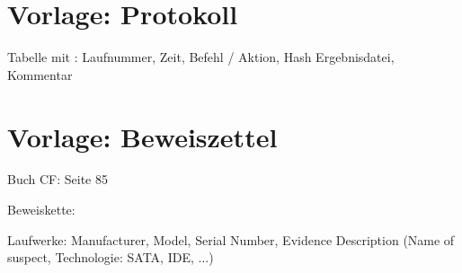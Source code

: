 
%



\chapter{Vorlage: Protokoll}


Tabelle mit : Laufnummer, Zeit, Befehl / Aktion, Hash Ergebnisdatei, Kommentar


\chapter{Vorlage: Beweiszettel}
Buch CF: Seite 85

Beweiskette:

Laufwerke: Manufacturer, Model, Serial Number, Evidence Description (Name of suspect, Technologie: SATA, IDE, ...)